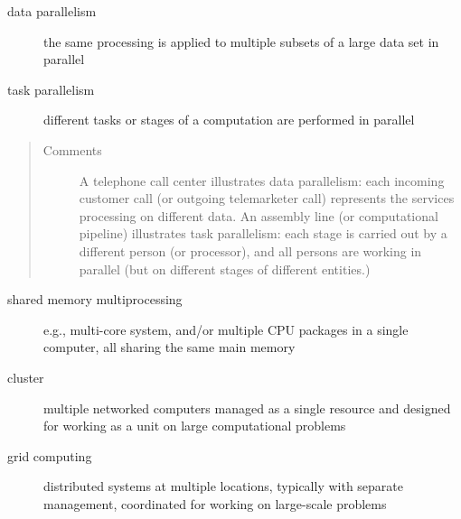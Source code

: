 \documentclass[letterpaper,10pt,english]{sphinxmanual}
\begin{document}
\begin{description}
\item[{data parallelism}] \leavevmode{}\label{Introduction/Introduction:term-data-parallelism}
the same processing is applied to multiple subsets of a large data set in parallel

\end{description}
\begin{description}
\item[{task parallelism}] \leavevmode{}\label{Introduction/Introduction:term-task-parallelism}
different tasks or stages of a computation are performed in parallel

\end{description}
\begin{quote}\begin{description}
\item[{Comments}] \leavevmode
A telephone call center illustrates data parallelism: each incoming customer call (or outgoing telemarketer call) represents the services processing on different data. An assembly line (or computational pipeline) illustrates task parallelism: each stage is carried out by a different person (or processor), and all persons are working in parallel (but on different stages of different entities.)

\end{description}\end{quote}
\begin{description}
\item[{shared memory multiprocessing}] \leavevmode{}\label{Introduction/Introduction:term-shared-memory-multiprocessing}
e.g., multi-core system, and/or multiple CPU packages in a single computer, all sharing the same main memory

\end{description}
\begin{description}
\item[{cluster}] \leavevmode{}\label{Introduction/Introduction:term-cluster}
multiple networked computers managed as a single resource and designed for working as a unit on large computational problems

\end{description}
\begin{description}
\item[{grid computing}] \leavevmode{}\label{Introduction/Introduction:term-grid-computing}
distributed systems at multiple locations, typically with separate management, coordinated for working on large-scale problems

\end{description}
\end{document}
